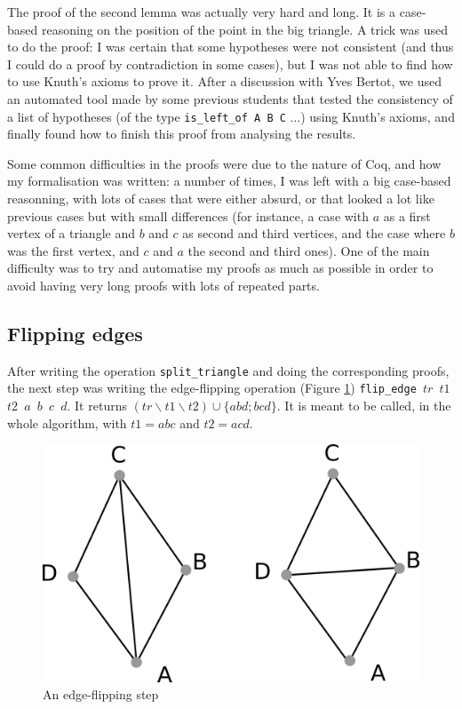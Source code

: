 \documentclass[a4paper,10pt]{article}
\begin{document}
The proof of the second lemma was actually very hard and long. It is a case-based reasoning on the position of the point in the big triangle. A trick was used to do the proof: I was certain that some hypotheses were not consistent (and thus I could do a proof by contradiction in some cases), but I was not able to find how to use Knuth's axioms to prove it. After a discussion with Yves Bertot, we used an automated tool made by some previous students that tested the consistency of a list of hypotheses (of the type {\tt is\_left\_of A B C} ...) using Knuth's axioms, and finally found how to finish this proof from analysing the results.

Some common difficulties in the proofs were due to the nature of {\sc Coq}, and how my formalisation was written: a number of times, I was left with a big case-based reasonning, with lots of cases that were either absurd, or that looked a lot like previous cases but with small differences (for instance, a case with $a$ as a first vertex of a triangle and $b$ and $c$ as second and third vertices, and the case where $b$ was the first vertex, and $c$ and $a$ the second and third ones). One of the main difficulty was to try and automatise my proofs as much as possible in order to avoid having very long proofs with lots of repeated parts.


  
\subsection{Flipping edges}
After writing the operation {\tt split\_triangle} and doing the corresponding proofs, the next step was writing the edge-flipping operation (Figure \ref{flip_edge}) {\tt flip\_edge $tr$ $t1$ $t2$ $a$ $b$ $c$ $d$}.
It returns $(tr \smallsetminus t1 \smallsetminus t2) \cup \{abd;bcd\}$. It is meant to be called, in the whole algorithm, with $t1 = abc$ and $t2=acd$.

\begin{figure}
  \centering
  \includegraphics[scale=2]{flip_edge}
    \caption{\label{flip_edge} An edge-flipping step}
\end{figure}
\end{document}

